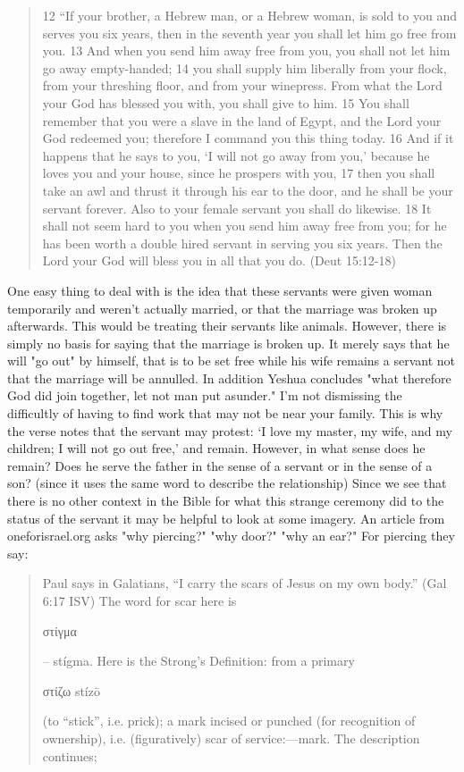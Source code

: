 \documentclass[11pt]{article}
\begin{document}
\begin{quote}
12 “If your brother, a Hebrew man, or a Hebrew woman, is sold to you and serves you six years, then in the seventh year you shall let him go free from you. 13 And when you send him away free from you, you shall not let him go away empty-handed; 14 you shall supply him liberally from your flock, from your threshing floor, and from your winepress. From what the Lord your God has blessed you with, you shall give to him. 15 You shall remember that you were a slave in the land of Egypt, and the Lord your God redeemed you; therefore I command you this thing today. 16 And if it happens that he says to you, ‘I will not go away from you,’ because he loves you and your house, since he prospers with you, 17 then you shall take an awl and thrust it through his ear to the door, and he shall be your servant forever. Also to your female servant you shall do likewise. 18 It shall not seem hard to you when you send him away free from you; for he has been worth a double hired servant in serving you six years. Then the Lord your God will bless you in all that you do. (Deut 15:12-18)
\end{quote}


One easy thing to deal with is the idea that these servants were given woman temporarily and weren't actually married, or that the marriage was broken up afterwards. This would be treating their servants like animals. However, there is simply no basis for saying that the marriage is broken up. It merely says that he will "go out" by himself, that is to be set free while his wife remains a servant not that the marriage will be annulled. In addition Yeshua concludes "what therefore God did join together, let not man put asunder." I'm not dismissing the difficultly of having to find work that may not be near your family. This is why the verse notes that the servant may protest: ‘I love my master, my wife, and my children; I will not go out free,’ and remain. However, in what sense does he remain? Does he serve the father in the sense of a servant or in the sense of a son? (since it uses the same word to describe the relationship) Since we see that there is no other context in the Bible for what this strange ceremony did to the status of the servant it may be helpful to look at some imagery. An article from oneforisrael.org asks "why piercing?" "why door?" "why an ear?"
For piercing they say:
\begin{quote}
Paul says in Galatians, “I carry the scars of Jesus on my own body.” (Gal 6:17 ISV) The word for scar here is \begin{greek} στίγμα \end{greek} – stígma. Here is the Strong’s Definition: from a primary \begin{greek} στίζω stízō \end{greek} (to “stick”, i.e. prick); a mark incised or punched (for recognition of ownership), i.e. (figuratively) scar of service:—mark. The description continues;\end{quote}
\end{document}
